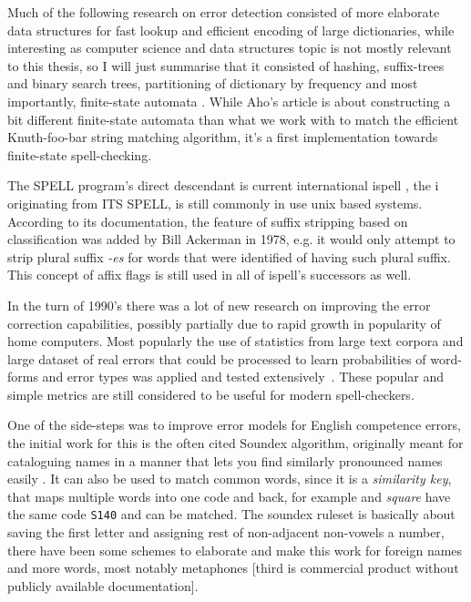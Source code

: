 \documentclass[officiallayout]{unihelcompling}
\newcommand\misspelt{\bgroup\markoverwith
{\textcolor{red}{\lower3.5pt\hbox{\sixly \char58}}}\ULon}
\begin{document}
Much of the following research on error detection consisted of more elaborate
data structures for fast lookup and efficient encoding of large dictionaries,
while interesting as computer science and data structures topic is not mostly
relevant to this thesis, so I will just summarise that it consisted of hashing,
suffix-trees and binary search trees, partitioning of dictionary by frequency
\citep{knuth1973art} and most importantly, finite-state automata
\citep{aho1975efficient}. While Aho's article is about constructing a bit
different finite-state automata than what we work with to match the
efficient Knuth-foo-bar string matching algorithm, it's
a first implementation towards finite-state spell-checking.

The SPELL program's direct descendant is current international ispell
\citep{gorin1971spell}, the i originating from ITS SPELL, is still commonly in
use unix based systems. According to its documentation, the feature of suffix
stripping based on classification was added by Bill Ackerman in 1978, e.g. it
would only attempt to strip plural suffix \emph{-es} for words that were
identified of having such plural suffix.  This concept of affix flags is still
used in all of ispell's successors as well.

In the turn of 1990's there was a lot of new research on improving the error
correction capabilities, possibly partially due to rapid growth in popularity
of home computers. Most popularly the use of statistics from large text corpora
and large dataset of real errors that could be processed to learn probabilities
of word-forms and error types was applied and tested
extensively~\citep{kernighan1990spelling,church1991probability}. These popular
and simple metrics are still considered to be useful for modern spell-checkers.

One of the side-steps was to improve error models for English competence
errors, the initial work for this is the often cited Soundex algorithm,
originally meant for cataloguing names in a manner that lets you find similarly
pronounced names easily \citep{russell1918soundex}. It can also be used to match
common words, since it is a \emph{similarity key}, that maps multiple words
into one code and back, for example \misspelt{squer} and \emph{square} have the
same code \texttt{S140} and can be matched. The soundex ruleset is basically
about saving the first letter and assigning rest of non-adjacent non-vowels a
number, there have been some schemes to elaborate and make this work for
foreign names and more words, most notably metaphones
\citep{philips1990hanging,philips2000double}[third is commercial product without
publicly available documentation].
\end{document}
